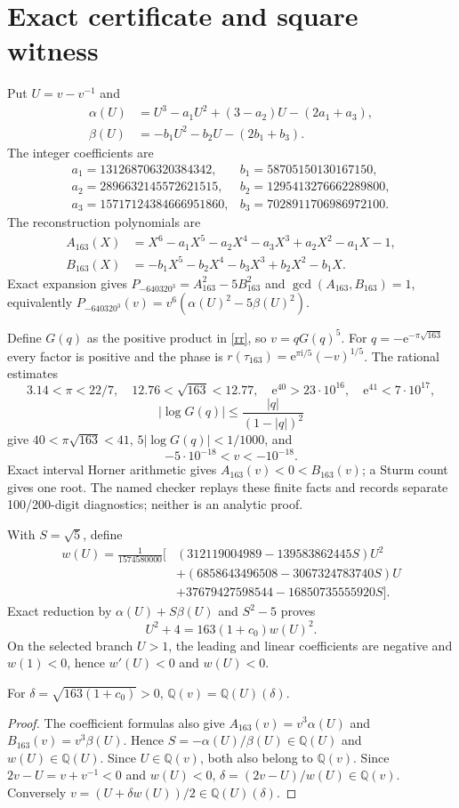 \documentclass[11pt]{article}
\newcommand{\Q}{\mathbb Q}\newcommand{\R}{\mathbb R}\newcommand{\ii}{\mathrm i}\newcommand{\e}{\mathrm e}\newcommand{\Fcal}{\mathcal F}\newcommand{\Tcal}{\mathcal T}
\begin{document}
\appendix
\section{Exact certificate and square witness}\label{certificate}
Put $U=v-v^{-1}$ and
\begin{align*}
\alpha(U)&=U^3-a_1U^2+(3-a_2)U-(2a_1+a_3),\\
\beta(U)&=-b_1U^2-b_2U-(2b_1+b_3).
\end{align*}
The integer coefficients are
\[
\begin{array}{ll}
a_1=131268706320384342,&b_1=58705150130167150,\\
a_2=2896632145572621515,&b_2=1295413276662289800,\\
a_3=15717124384666951860,&b_3=7028911706986972100.
\end{array}
\]
The reconstruction polynomials are
\begin{align*}
A_{163}(X)&=X^6-a_1X^5-a_2X^4-a_3X^3+a_2X^2-a_1X-1,\\
B_{163}(X)&=-b_1X^5-b_2X^4-b_3X^3+b_2X^2-b_1X.
\end{align*}
Exact expansion gives $P_{-640320^3}=A_{163}^2-5B_{163}^2$ and
$\gcd(A_{163},B_{163})=1$, equivalently
$P_{-640320^3}(v)=v^6(\alpha(U)^2-5\beta(U)^2)$.

Define $G(q)$ as the positive product in \eqref{rr}, so $v=qG(q)^5$.
For $q=-\e^{-\pi\sqrt{163}}$ every factor is positive and the phase is
$r(\tau_{163})=\e^{\pi\ii/5}(-v)^{1/5}$.  The rational estimates
\[
3.14<\pi<22/7,\quad12.76<\sqrt{163}<12.77,\quad
\e^{40}>23\cdot10^{16},\quad\e^{41}<7\cdot10^{17},
\]
\[
|\log G(q)|\le \frac{|q|}{(1-|q|)^2}
\]
give $40<\pi\sqrt{163}<41$, $5|\log G(q)|<1/1000$, and
\[
-5\cdot10^{-18}<v<-10^{-18}.
\]
Exact interval Horner arithmetic gives $A_{163}(v)<0<B_{163}(v)$; a Sturm
count gives one root.  The named checker
 replays these finite facts and
 records separate 100/200-digit diagnostics;
neither is an analytic proof.

With $S=\sqrt5$, define
\begin{align*}
w(U)=\frac{1}{1574580000}[&(312119004989-139583862445S)U^2\\
&+(6858643496508-3067324783740S)U\\
&+37679427598544-16850735555920S].
\end{align*}
Exact reduction by $\alpha(U)+S\beta(U)$ and $S^2-5$ proves
\[
U^2+4=163(1+c_0)w(U)^2.
\]
On the selected branch $U>1$, the leading and linear coefficients are
negative and $w(1)<0$, hence $w'(U)<0$ and $w(U)<0$.
\begin{corollary}\label{equality}
For $\delta=\sqrt{163(1+c_0)}>0$, $\Q(v)=\Q(U)(\delta)$.
\end{corollary}
\begin{proof}
The coefficient formulas also give
$A_{163}(v)=v^3\alpha(U)$ and $B_{163}(v)=v^3\beta(U)$.
Hence $S=-\alpha(U)/\beta(U)\in\Q(U)$ and $w(U)\in\Q(U)$.
Since $U\in\Q(v)$, both also belong to $\Q(v)$.  Since
$2v-U=v+v^{-1}<0$ and $w(U)<0$,
$\delta=(2v-U)/w(U)\in\Q(v)$.  Conversely
$v=(U+\delta w(U))/2\in\Q(U)(\delta)$.
\end{proof}
\end{document}

